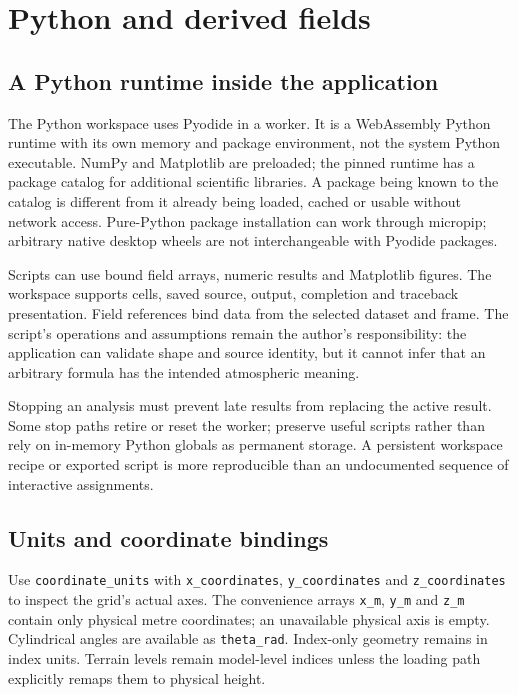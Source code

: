 \section{Python and derived fields}
\subsection{A Python runtime inside the application}
The Python workspace uses Pyodide in a worker. It is a WebAssembly Python runtime
with its own memory and package environment, not the system Python executable.
NumPy and Matplotlib are preloaded; the pinned runtime has a package catalog for
additional scientific libraries. A package being known to the catalog is
different from it already being loaded, cached or usable without network access.
Pure-Python package installation can work through micropip; arbitrary native
desktop wheels are not interchangeable with Pyodide packages.

Scripts can use bound field arrays, numeric results and Matplotlib figures.
The workspace supports cells, saved source, output, completion and traceback
presentation. Field references bind data from the selected dataset and frame.
The script's operations and assumptions remain the author's responsibility:
the application can validate shape and source identity, but it cannot infer that
an arbitrary formula has the intended atmospheric meaning.

Stopping an analysis must prevent late results from replacing the active result.
Some stop paths retire or reset the worker; preserve useful scripts rather than
rely on in-memory Python globals as permanent storage. A persistent workspace
recipe or exported script is more reproducible than an undocumented sequence of
interactive assignments.

\subsection{Units and coordinate bindings}
Use \texttt{coordinate\_units} with \texttt{x\_coordinates},
\texttt{y\_coordinates} and \texttt{z\_coordinates} to inspect the grid's actual
axes. The convenience arrays \texttt{x\_m}, \texttt{y\_m} and \texttt{z\_m}
contain only physical metre coordinates; an unavailable physical axis is empty.
Cylindrical angles are available as \texttt{theta\_rad}. Index-only geometry
remains in index units. Terrain levels remain model-level indices unless the
loading path explicitly remaps them to physical height.

